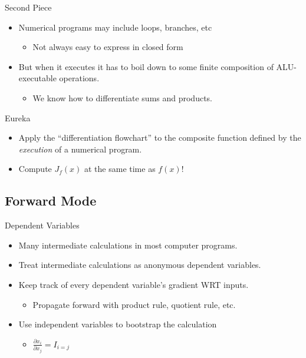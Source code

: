 \documentclass[pdf]{beamer}
\begin{document}
\begin{frame}{Second Piece}
  \begin{itemize}
  \item Numerical programs may include loops, branches, etc
    \begin{itemize}
    \item Not always easy to express in closed form
    \end{itemize}
  \item But when it executes it has to boil down to some finite composition of
    ALU-executable operations.
    \begin{itemize}
    \item We know how to differentiate sums and products.
    \end{itemize}
  \end{itemize}
\end{frame}

\begin{frame}{Eureka}
  \begin{itemize}
  \item Apply the ``differentiation flowchart'' to the composite function defined by
  the \emph{execution} of a numerical program.
  \item Compute $J_f(x)$ at the same time as $f(x)$!
  \end{itemize}
\end{frame}

\subsection{Forward Mode}
\begin{frame}{Dependent Variables}
  \begin{itemize}
  \item Many intermediate calculations in most computer programs.
  \item Treat intermediate calculations as anonymous dependent variables.
  \item Keep track of every dependent variable's gradient WRT inputs.
    \begin{itemize}
    \item Propagate forward with product rule, quotient rule, etc.
    \end{itemize}
  \item Use independent variables to bootstrap the calculation
    \begin{itemize}
    \item $\frac{\partial x_i}{\partial x_j} = I_{i=j}$
    \end{itemize}
  \end{itemize}
\end{frame}
\end{document}
